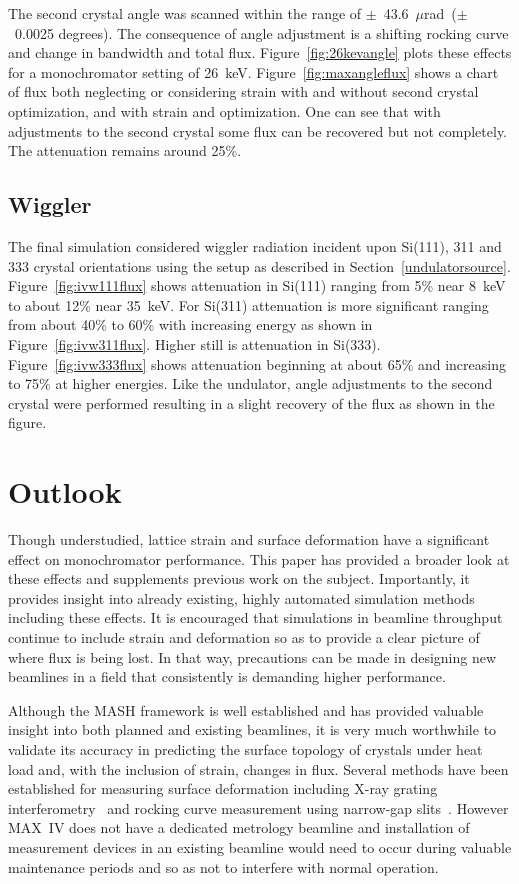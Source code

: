 \documentclass{iucr}
\begin{document}
The second crystal angle was scanned within the range of $\pm$~43.6~$\mu$rad~($\pm$~0.0025 degrees). The consequence of angle adjustment is a shifting rocking curve and change in bandwidth and total flux. Figure~\ref{fig:26kevangle} plots these effects for a monochromator setting of 26~keV. Figure~\ref{fig:maxangleflux} shows a chart of flux both neglecting or considering strain with and without second crystal optimization, and with strain and optimization. One can see that with adjustments to the second crystal some flux can be recovered but not completely. The attenuation remains around 25\%.

\subsection{Wiggler}
The final simulation considered wiggler radiation incident upon Si(111), 311 and 333 crystal orientations using the setup as described in Section~\ref{undulatorsource}. Figure~\ref{fig:ivw111flux} shows attenuation in Si(111) ranging from 5\% near 8~keV to about 12\% near 35~keV. For Si(311) attenuation is more significant ranging from about 40\% to 60\% with increasing energy as shown in Figure~\ref{fig:ivw311flux}. Higher still is attenuation in Si(333). Figure~\ref{fig:ivw333flux} shows attenuation beginning at about 65\% and increasing to 75\% at higher energies. Like the undulator, angle adjustments to the second crystal were performed resulting in a slight recovery of the flux as shown in the figure.




\section{Outlook}

Though understudied, lattice strain and surface deformation have a significant effect on monochromator performance. This paper has provided a broader look at these effects and supplements previous work on the subject. Importantly, it provides insight into already existing, highly automated simulation methods including these effects. It is encouraged that simulations in beamline throughput continue to include strain and deformation so as to provide a clear picture of where flux is being lost. In that way, precautions can be made in designing new beamlines in a field that consistently is demanding higher performance.

Although the MASH framework is well established and has provided valuable insight into both planned and existing beamlines, it is very much worthwhile to validate its accuracy in predicting the surface topology of crystals under heat load and, with the inclusion of strain, changes in flux. Several methods have been established for measuring surface deformation including X-ray grating interferometry~\cite{rutishauser} and rocking curve measurement using narrow-gap slits~\cite{Zhang}. However MAX~IV does not have a dedicated metrology beamline and installation of measurement devices in an existing beamline would need to occur during valuable maintenance periods and so as not to interfere with normal operation.
\end{document}
